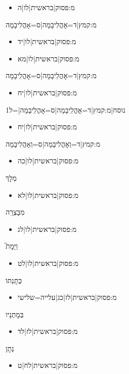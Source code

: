 \begin{itemize}
{{{{{{{{{{{{{{\begin{itemize} \item {{מ:פסוק|בראשית|לו|ה}}
\end{itemize}
 \item {{מ:קמץ|ד=אׇהֳלִיבָמָה|ס=אָהֳלִיבָמָה}}
\begin{itemize} \item {{מ:פסוק|בראשית|לו|יד}}\item {{מ:פסוק|בראשית|לו|מא}}
\end{itemize}
 \item {{מ:קמץ|ד=אׇהֳלִֽיבָמָה|ס=אָהֳלִֽיבָמָה}}
\begin{itemize} \item {{מ:פסוק|בראשית|לו|יח}}
\end{itemize}
 \item {{נוסח|{{מ:קמץ|ד=אׇהֳלִֽיבָמָה|ס=אָהֳלִֽיבָמָה}}|=ל1
\begin{itemize} \item {{מ:פסוק|בראשית|לו|יח}}
\end{itemize}
 \item {{מ:קמץ|ד=וְאׇהֳלִיבָמָה|ס=וְאָהֳלִיבָמָה}}
\begin{itemize} \item {{מ:פסוק|בראשית|לו|כה}}
\end{itemize}
 \item מְלׇךְ
\begin{itemize} \item {{מ:פסוק|בראשית|לו|לא}}
\end{itemize}
 \item מִבׇּצְרָֽה
\begin{itemize} \item {{מ:פסוק|בראשית|לו|לג}}
\end{itemize}
 \item וַיָּמׇת֮
\begin{itemize} \item {{מ:פסוק|בראשית|לו|לט}}
\end{itemize}
 \item כֻּתׇּנְתּוֹ
\begin{itemize} \item {{מ:פסוק|בראשית|לז|כג|עלייה=שלישי}}
\end{itemize}
 \item בְּמׇתְנָיו
\begin{itemize} \item {{מ:פסוק|בראשית|לז|לד}}
\end{itemize}
 \item נְתׇן
\begin{itemize} \item {{מ:פסוק|בראשית|לח|ט}}

\end{itemize}}}}}}}}}}}}}}}}}
\end{itemize}
